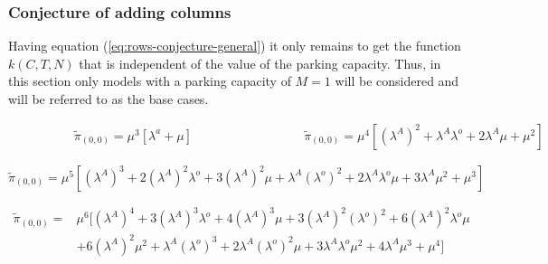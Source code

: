 \subsubsection{Conjecture of adding columns}
Having equation (\ref{eq:rows-conjecture-general}) it only remains to get the function \(k(C,T,N)\) that is independent of the value of the parking capacity. Thus, in this section only models with a parking capacity of \(M=1\) will be considered and will be referred to as the base cases. 

\begin{multicols}{2}
    \begin{figure}[H]
        \centering
        \scalebox{0.9}{}
    \end{figure}
    \columnbreak
    \begin{figure}[H]
        \centering
        \scalebox{0.9}{}
    \end{figure}
\end{multicols}
\vspace{-0.5cm}
\begin{alignat}{2} \label{eq:00_rate_1131}
    \hspace{4em} & \tilde{\pi}_{(0,0)} = \mu^3[\lambda^a + \mu] \hspace{8em} & \tilde{\pi}_{(0,0)} = \mu^4[(\lambda^A)^2 + \lambda^A \lambda^o + 2\lambda^A \mu + \mu^2] 
\end{alignat}


\begin{figure}[h]
    \centering
    \scalebox{0.8}{}
\end{figure}
\begin{equation}\label{eq:00_rate_1141}
    \tilde{\pi}_{(0,0)} = \mu^5[(\lambda^A)^3 + 2(\lambda^A)^2 \lambda^o + 3(\lambda^A)^2 \mu + \lambda^A (\lambda^o)^2 + 2\lambda^A \lambda^o \mu + 3\lambda^A \mu^2 + \mu^3]
\end{equation}

\begin{figure}[h]
    \centering
    \scalebox{0.8}{}
\end{figure}
\begin{align}\label{eq:00_rate_1151}
    \tilde{\pi}_{(0,0)} =& \mu^6[(\lambda^A)^4 + 3(\lambda^A)^3 \lambda^o + 4(\lambda^A)^3 \mu + 3(\lambda^A)^2 (\lambda^o)^2 + 6(\lambda^A)^2 \lambda^o \mu \\
    & + 6(\lambda^A)^2 \mu^2 + \lambda^A (\lambda^o)^3 + 2\lambda^A (\lambda^o)^2 \mu + 3\lambda^A \lambda^o \mu^2 + 4\lambda^A \mu^3 + \mu^4] \nonumber
\end{align}


